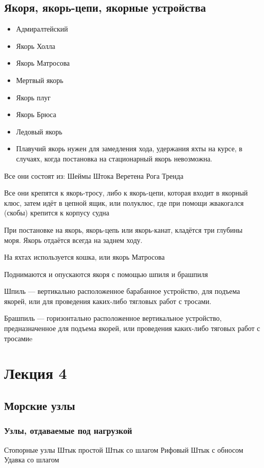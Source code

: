 \documentclass{article}        %
\begin{document}
\begin{description}
\subsection{Якоря, якорь-цепи, якорные устройства}
\begin{itemize}
	\item Адмиралтейский
	\item Якорь Холла
	\item Якорь Матросова
	\item Мертвый якорь
	\item Якорь плуг
	\item Якорь Брюса
	\item Ледовый якорь
	\item Плавучий якорь 
		нужен для замедления хода, удержания яхты на курсе, в случаях, когда постановка на стационарный якорь невозможна.
\end{itemize}

Все они состоят из:
	Шеймы
	Штока
	Веретена
	Рога
	Тренда

Все они крепятся к якорь-тросу, либо к якорь-цепи, которая входит в якорный клюс, затем идёт в цепной ящик, или полуклюс, где при помощи жвакогался (скобы) крепится к корпусу судна

При постановке на якорь, якорь-цепь или якорь-канат, кладётся три глубины моря.
Якорь отдаётся всегда на заднем ходу.

На яхтах используется кошка, или якорь Матросова

Поднимаются и опускаются якоря с помощью шпиля и брашпиля

Шпиль --- вертикально расположенное барабанное устройство, для подъема якорей, или для проведения каких-либо тягловых работ с тросами.

Брашпиль --- горизонтально расположенное вертикальное устройство, предназначенное для подъема якорей, или проведения каких-либо тяговых работ с тросамиe


\section{Лекция 4}
\subsection{Морские узлы}
\subsubsection{Узлы, отдаваемые под нагрузкой}
	Стопорные узлы
	Штык простой
	Штык со шлагом
	Рифовый
	Штык с обносом
	Удавка со шлагом


\end{description}
\end{document}
